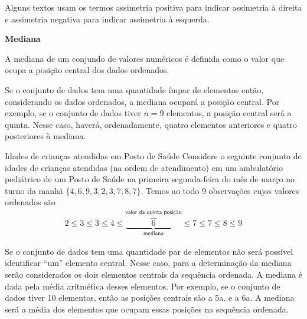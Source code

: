 Alguns textos usam os termos assimetria positiva para indicar assimetria à direita e assimetria negativa para indicar assimetria à esquerda.

\textbf{Mediana}

A mediana de um conjundo de valores numéricos é definida como o valor que ocupa a posição central dos dados ordenados.

Se o conjunto de dados tem uma quantidade ímpar de elementos então, considerando os dados ordenados, a mediana ocupará a posição central. Por exemplo, se o conjunto de dados tiver \(n=9\) elementos,  a posição central será a quinta. Nesse caso, haverá, ordenadamente, quatro elementos anteriores e quatro posteriores à mediana.


\begin{example}{Idades de crianças atendidas em Posto de Saúde}
Considere o seguinte conjunto de idades de crianças atendidas (na ordem de atendimento) em um ambulatório pediátrico de um Posto de Saúde na primeira segunda-feira do mês de março no turno da manhã \(\{4,6,9,3,2,3,7,8,7\}\). Temos ao todo 9 observações cujos valores ordenados são
\begin{equation*}
\begin{split}2 \leq 3 \leq 3 \leq 4 \leq \underbrace{\overbrace{6}^{\textsf{valor da quinta posição}}}_{\textsf{mediana}} \leq 7 \leq 7 \leq 8 \leq 9\end{split}
\end{equation*}
\end{example}
Se o conjunto de dados tem uma quantidade par de elementos não será possível identificar “um” elemento central. Nesse caso, para a determinação da mediana serão considerados os dois elementos centrais da sequência ordenada. A mediana é dada pela média aritmética desses elementos. Por exemplo, se o conjunto de dados tiver 10 elementos, então as posições centrais são a 5a. e a 6a. A mediana será a média dos elementos que ocupam essas posições na sequência ordenada.


